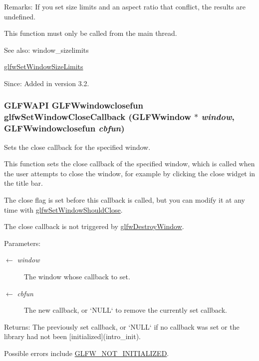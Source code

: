 \begin{Desc}
\item[Remarks:]If you set size limits and an aspect ratio that conflict, the results are undefined.\end{Desc}
This function must only be called from the main thread.

\begin{Desc}
\item[See also:]window\_\-sizelimits 

\hyperlink{group__window_g8af814fc98d786d1de2505b40b707de8}{glfwSetWindowSizeLimits}\end{Desc}
\begin{Desc}
\item[Since:]Added in version 3.2. \end{Desc}
\hypertarget{group__window_g5b827da350141c789acd64f5c4f7a0e1}{
\subsubsection[glfwSetWindowCloseCallback]{\setlength{\rightskip}{0pt plus 5cm}GLFWAPI {\bf GLFWwindowclosefun} glfwSetWindowCloseCallback ({\bf GLFWwindow} $\ast$ {\em window}, \/  {\bf GLFWwindowclosefun} {\em cbfun})}}
\label{group__window_g5b827da350141c789acd64f5c4f7a0e1}


Sets the close callback for the specified window. 

This function sets the close callback of the specified window, which is called when the user attempts to close the window, for example by clicking the close widget in the title bar.

The close flag is set before this callback is called, but you can modify it at any time with \hyperlink{group__window_g1cadeda7a1e2f224e06a8415d30741aa}{glfwSetWindowShouldClose}.

The close callback is not triggered by \hyperlink{group__window_g806747476b7247d292be3711c323ea10}{glfwDestroyWindow}.

\begin{Desc}
\item[Parameters:]
\begin{description}
\item[\mbox{$\leftarrow$} {\em window}]The window whose callback to set. \item[\mbox{$\leftarrow$} {\em cbfun}]The new callback, or `NULL` to remove the currently set callback. \end{description}
\end{Desc}
\begin{Desc}
\item[Returns:]The previously set callback, or `NULL` if no callback was set or the library had not been \mbox{[}initialized\mbox{]}(intro\_\-init).\end{Desc}
Possible errors include \hyperlink{group__errors_g2374ee02c177f12e1fa76ff3ed15e14a}{GLFW\_\-NOT\_\-INITIALIZED}.

